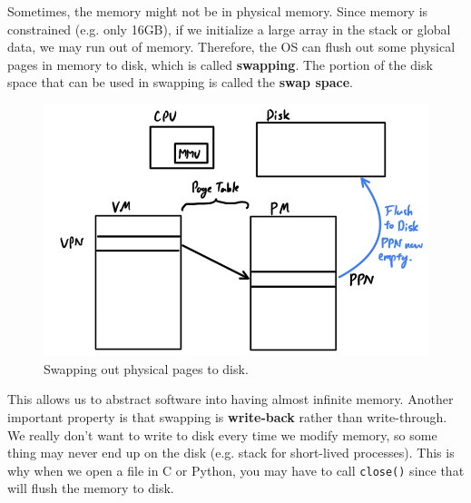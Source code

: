 \documentclass{article}
\begin{document}
    \begin{definition}
      Sometimes, the memory might not be in physical memory. Since memory is constrained (e.g. only 16GB), if we initialize a large array in the stack or global data, we may run out of memory. Therefore, the OS can flush out some physical pages in memory to disk, which is called \textbf{swapping}. The portion of the disk space that can be used in swapping is called the \textbf{swap space}. 
      \begin{figure}[H]
        \centering 
        \includegraphics[scale=0.4]{img/swap.png}
        \caption{Swapping out physical pages to disk.} 
        \label{fig:swap}
      \end{figure}
      This allows us to abstract software into having almost infinite memory. Another important property is that swapping is \textbf{write-back} rather than write-through. We really don't want to write to disk every time we modify memory, so some thing may never end up on the disk (e.g. stack for short-lived processes). This is why when we open a file in C or Python, you may have to call \texttt{close()} since that will flush the memory to disk. 
    \end{definition}
\end{document}
